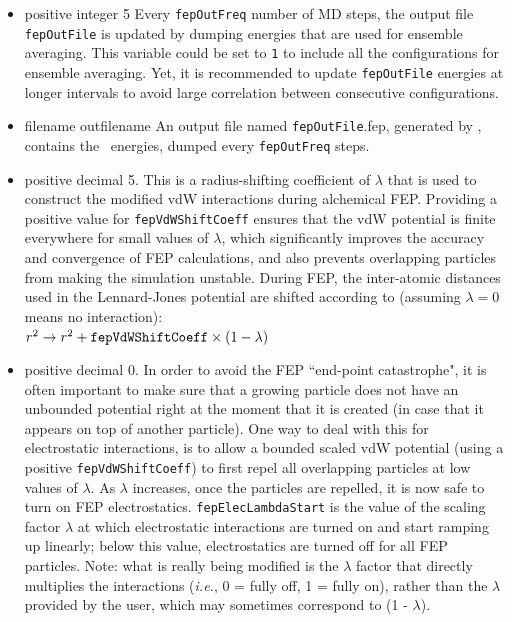 \begin{itemize}
\item
{}
{positive integer}
{5}
{Every {\tt fepOutFreq} number of MD steps, the output file
{\tt fepOutFile} is updated by dumping energies that are
used for ensemble averaging.
This variable could be set to {\tt 1} to include all the 
configurations for ensemble averaging. Yet, it is recommended
to update {\tt fepOutFile}  energies at longer intervals
to avoid large correlation between consecutive configurations.}

\item
{}
{filename}
{outfilename}
{An output file named {\tt fepOutFile}.fep, generated by \NAMD,
contains the \FEP\ energies, dumped every {\tt fepOutFreq} steps.}

\item
{}
{positive decimal}
{5.}
{This is a radius-shifting coefficient of $\lambda$ that is used 
to construct the modified vdW interactions during alchemical FEP. Providing a positive value for {\tt fepVdWShiftCoeff} ensures that the vdW potential is finite everywhere for small values of $\lambda$, which significantly improves the accuracy and convergence of FEP calculations, and also prevents overlapping particles from making the simulation unstable. During FEP, the inter-atomic distances used in the Lennard-Jones potential are shifted
according to (assuming $\lambda = 0$ means no interaction): \\
$r^2 \rightarrow r^2 + {\tt fepVdWShiftCoeff} \times (1 - \lambda)$
}

\item
{}
{positive decimal}
{0.}
{In order to avoid the FEP ``end-point catastrophe", it is often important to make sure that a growing particle does not have an unbounded potential right at the moment that it is created (in case that it appears on top of another particle). One way to deal with this for electrostatic interactions, is to allow a bounded scaled vdW potential (using a positive {\tt fepVdWShiftCoeff}) to first repel all overlapping particles at low values of $\lambda$. As $\lambda$ increases, once the particles are repelled, it is now safe to turn on FEP electrostatics. {\tt fepElecLambdaStart} is the value of the scaling factor $\lambda$ at which electrostatic interactions are turned on and start ramping up linearly; below this value, electrostatics are turned off for all FEP particles. Note: what is really being modified is the $\lambda$ factor that directly multiplies the interactions (\emph{i.e.}, 0 = fully off, 1 = fully on), rather than the $\lambda$ provided by the user, which may sometimes correspond to (1 - $\lambda$).}



\end{itemize}
